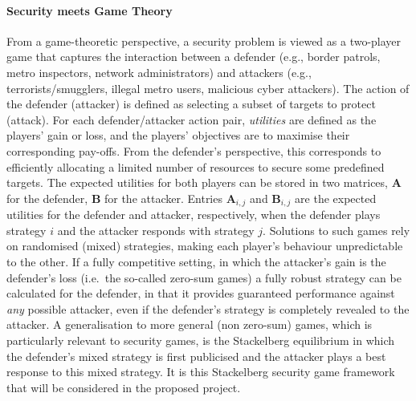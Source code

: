 \paragraph{Security meets Game Theory }
From a game-theoretic perspective, a security problem is viewed as a two-player game that captures the interaction between a defender (e.g., border patrols, metro inspectors, network administrators) and attackers (e.g., terrorists/smugglers, illegal metro users, malicious cyber attackers). The action of the defender (attacker) is defined as selecting a subset of targets to protect (attack). For each defender/attacker action pair, \textit{utilities} are defined as the players' gain or loss, and the players' objectives are to maximise their corresponding pay-offs. From the defender's perspective, this corresponds to efficiently allocating a limited number of resources to secure some predefined targets. The expected utilities for both players can be stored in two  matrices,  $\boldsymbol A$ for the defender,  $\boldsymbol B$ for the attacker. Entries $\boldsymbol A_{i,j}$ and  $\boldsymbol  B_{i,j}$  are the expected utilities for the defender and attacker, respectively, when the defender plays strategy $i$ and the attacker responds with strategy $j$.
Solutions to such games rely on randomised (mixed) strategies, making each player's behaviour unpredictable to the other.  If a fully competitive setting, in which the attacker's gain is the defender's loss (i.e.\ the so-called zero-sum games) a fully robust strategy can be calculated for the defender, in that it provides guaranteed performance against {\em any} possible attacker, even if the defender's strategy is completely revealed to the attacker.  
A generalisation to more general (non zero-sum) games, which is particularly relevant to security games, is the Stackelberg equilibrium\cite{korzhyk2011stackelberg} in which the defender's mixed strategy is first publicised and the attacker plays a best response to this mixed strategy.
It is this Stackelberg security game framework that will be considered in the proposed project.

